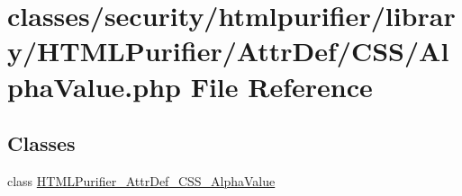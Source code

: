 \hypertarget{AlphaValue_8php}{\section{classes/security/htmlpurifier/library/\+H\+T\+M\+L\+Purifier/\+Attr\+Def/\+C\+S\+S/\+Alpha\+Value.php File Reference}
\label{AlphaValue_8php}
}
\subsection*{Classes}
\begin{DoxyCompactItemize}
\item 
class \hyperlink{classHTMLPurifier__AttrDef__CSS__AlphaValue}{H\+T\+M\+L\+Purifier\+\_\+\+Attr\+Def\+\_\+\+C\+S\+S\+\_\+\+Alpha\+Value}
\end{DoxyCompactItemize}

